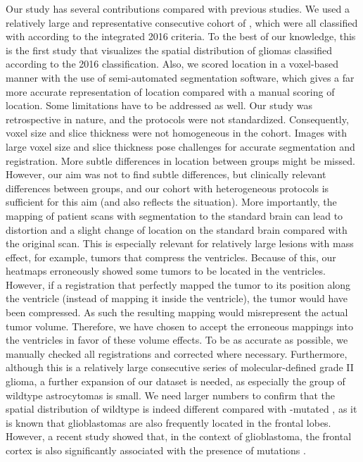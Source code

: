 Our study has several contributions compared with previous studies.
We used a relatively large and representative consecutive cohort of , which were all classified with  according to the integrated  2016 criteria.
To the best of our knowledge, this is the first study that visualizes the spatial distribution of gliomas classified according to the  2016 classification.
Also, we scored location in a voxel-based manner with the use of semi-automated segmentation software, which gives a far more accurate representation of location compared with a manual scoring of location.
Some limitations have to be addressed as well.
Our study was retrospective in nature, and the  protocols were not standardized.
Consequently, voxel size and slice thickness were not homogeneous in the cohort.
Images with large voxel size and slice thickness pose challenges for accurate segmentation and registration.
More subtle differences in location between groups might be missed.
However, our aim was not to find subtle differences, but clinically relevant differences between groups, and our cohort with heterogeneous  protocols is sufficient for this aim (and also reflects the  situation).
More importantly, the mapping of patient  scans with segmentation to the  standard brain can lead to distortion and a slight change of location on the standard brain compared with the original  scan.
This is especially relevant for relatively large lesions with mass effect, for example, \glspl{tumor} that compress the ventricles.
Because of this, our heatmaps erroneously showed some \glspl{tumor} to be located in the ventricles.
However, if a registration that perfectly mapped the \gls{tumor} to its position along the ventricle (instead of mapping it inside the ventricle), the \gls{tumor} would have been compressed.
As such the resulting mapping would misrepresent the actual \gls{tumor} volume.
Therefore, we have chosen to accept the erroneous mappings into the ventricles in favor of these volume effects.
To be as accurate as possible, we manually checked all registrations and corrected where necessary.
Furthermore, although this is a relatively large consecutive series of molecular-defined grade II glioma, a further expansion of our dataset is needed, as especially the group of  wildtype astrocytomas is small.
We need larger numbers to confirm that the spatial distribution of  wildtype  is indeed different compared with -mutated , as it is known that glioblastomas are also frequently located in the frontal lobes.
However, a recent study showed that, in the context of glioblastoma, the frontal cortex is also significantly associated with the presence of  mutations \autocite{tejada2018voxel}.

